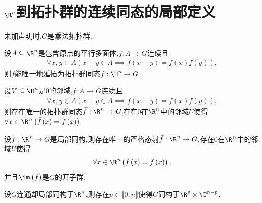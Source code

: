 \section{\texorpdfstring{$\R^{n}$}{Rn}到拓扑群的连续同态的局部定义}

未加声明时,$G$是乘法拓扑群.

\begin{proposition}{}{}
	设$A\subseteq\R^{n}$是包含原点的平行多面体,$f:A\to G$连续且
	\begin{align*}
		\forall x,y\in A\left(x+y\in A\implies f\left(x+y\right)=f\left(x\right)f\left(y\right)\right),
	\end{align*}
	则$f$能唯一地延拓为拓扑群同态$\bar{f}:\R^{n}\to G$.
\end{proposition}

\begin{corollary}{}{}
	设$V\subseteq\R^{n}$是$0$的邻域,$f:A\to G$连续且
	\begin{align*}
		\forall x,y\in A\left(x+y\in A\implies f\left(x+y\right)=f\left(x\right)f\left(y\right)\right),
	\end{align*}
	则存在唯一的拓扑群同态$\bar{f}:\R^{n}\to G$,存在$0$在$\R^{n}$中的邻域$U$使得$\forall x\in\R^{n}\left(\bar{f}\left(x\right)=f\left(x\right)\right)$.
\end{corollary}

\begin{corollary}{}{}
	设$f:\R^{n}\to G$是局部同构,则存在唯一的严格态射$\bar{f}:\R^{n}\to G$,存在$0$在$\R^{n}$中的邻域$U$使得
	\begin{align*}
		\forall x\in\R^{n}\left(\bar{f}\left(x\right)=f\left(x\right)\right),
	\end{align*}
	并且$\im\left(\bar{f}\right)$是$G$的开子群.
\end{corollary}

\begin{theorem}{}{}
	设$G$连通却局部同构于$\R^{n}$,则存在$p\in\llbracket 0,n\rrbracket$使得$G$同构于$\R^{p}\times\T^{n-p}$.
\end{theorem}
